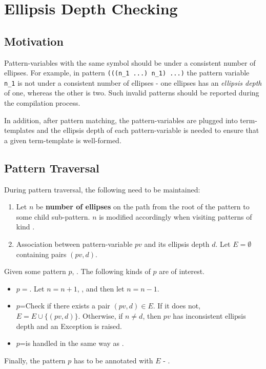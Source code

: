 \section{Ellipsis Depth Checking}

\subsection{Motivation}

Pattern-variables with the same symbol should be under a consistent number of ellipses. For example, in pattern \texttt{(((n\_1 ...) n\_1) ...)} the pattern variable \texttt{n\_1} is not under a consistent number of ellipses - one ellipses has an \textit{ellipsis depth} of one, whereas the other is two. Such invalid patterns should be reported during the compilation process.

In addition, after pattern matching, the pattern-variables are plugged into term-templates and the ellipsis depth of each pattern-variable is needed to ensure that a given term-template is well-formed.

\subsection{Pattern Traversal}

During pattern traversal, the following need to be maintained:

\begin{enumerate}
\item
Let $n$ be \textbf{number of ellipses} on the path from the root of the pattern to some child sub-pattern. $n$ is modified accordingly when visiting patterns of kind \RepeatNoArg.

\item Association between pattern-variable $pv$ and its ellipsis depth $d$. Let $E=\emptyset$ containing pairs $(pv, d)$.
\end{enumerate}

Given some pattern $p$, . The following kinds of $p$ are of interest.
\begin{itemize}
\item $p=$\PatternRepeat. Let $n=n+1$, , and then let $n=n-1$.
\item $p$=\BuiltInPattern Check if there exists a pair $(pv, d) \in E$. If it does not, $E = E \cup \{ (pv, d) \}$. Otherwise, if $n \neq d$, then $pv$ has inconsistent ellipsis depth and an Exception is raised.
\item $p$=\NonTerminal is handled in the same way as \BuiltInPatternNoArg.
\end{itemize}

Finally, the pattern $p$ has to be annotated with $E$ - .
